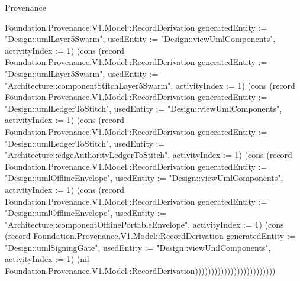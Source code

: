 \begin{lexlean}{Provenance}
\begin{semanticmodule}
{Foundation.Provenance.V1.Model::RecordDerivation {generatedEntity := "Design::umlLayer5Swarm", usedEntity := "Design::viewUmlComponents", activityIndex := 1}) (cons (record Foundation.Provenance.V1.Model::RecordDerivation {generatedEntity := "Design::umlLayer5Swarm", usedEntity := "Architecture::componentStitchLayer5Swarm", activityIndex := 1}) (cons (record Foundation.Provenance.V1.Model::RecordDerivation {generatedEntity := "Design::umlLedgerToStitch", usedEntity := "Design::viewUmlComponents", activityIndex := 1}) (cons (record Foundation.Provenance.V1.Model::RecordDerivation {generatedEntity := "Design::umlLedgerToStitch", usedEntity := "Architecture::edgeAuthorityLedgerToStitch", activityIndex := 1}) (cons (record Foundation.Provenance.V1.Model::RecordDerivation {generatedEntity := "Design::umlOfflineEnvelope", usedEntity := "Design::viewUmlComponents", activityIndex := 1}) (cons (record Foundation.Provenance.V1.Model::RecordDerivation {generatedEntity := "Design::umlOfflineEnvelope", usedEntity := "Architecture::componentOfflinePortableEnvelope", activityIndex := 1}) (cons (record Foundation.Provenance.V1.Model::RecordDerivation {generatedEntity := "Design::umlSigningGate", usedEntity := "Design::viewUmlComponents", activityIndex := 1}) (nil Foundation.Provenance.V1.Model::RecordDerivation)))))))))))))))))))))))))
}


\end{semanticmodule}
\end{lexlean}
